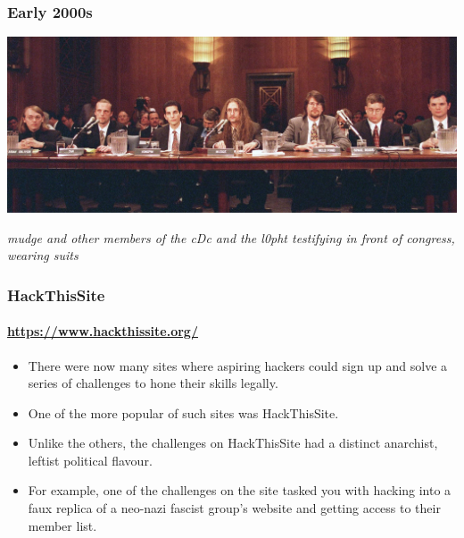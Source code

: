 \documentclass[aspectratio=169,usenames,dvipsnames]{beamer}
\begin{document}
\begin{frame}[c]
  \frametitle{Early 2000s}

  \centering

  \includegraphics[width=\textwidth,height=0.75\textheight,keepaspectratio]{img/l0pht_congress.jpg}

  \footnotesize
  \emph{mudge and other members of the cDc and the l0pht testifying in front
  of congress, wearing suits}
\end{frame}

\begin{frame}
  \frametitle{HackThisSite}
  \framesubtitle{\url{https://www.hackthissite.org/}}

  \begin{itemize}[<+->]
    \item There were now many sites where aspiring hackers could sign up and
      solve a series of challenges to hone their skills legally.
    \item One of the more popular of such sites was HackThisSite.
    \item Unlike the others, the challenges on HackThisSite had a distinct
      anarchist, leftist political flavour.
    \item For example, one of the challenges on the site tasked you with
      hacking into a faux replica of a neo-nazi fascist group's website and
      getting access to their member list.
  \end{itemize}

\end{frame}
\end{document}

